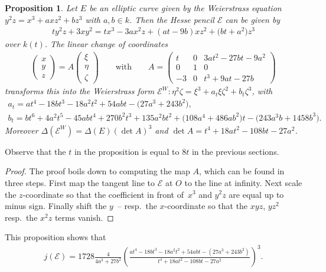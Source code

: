 \documentclass[11pt]{article}
\newcommand{\msetp}[1]{{\left({#1}\right)}}					%
\numberwithin{equation}{section}
\newtheorem{Proposition}[Theorem]{Proposition}
\begin{document}
\begin{Proposition}\label{prop7}Let $E$ be an elliptic curve given by the Weierstrass equation $y^2z=x^3+axz^2+bz^3$ with $a,b\in k$. Then the Hesse pencil $\mathcal{E}$ can be given by
\begin{gather*}
ty^2z+3xy^2=tx^3-3ax^2z+\msetp{at-9b}xz^2+ \big(bt+a^2\big)z^3
\end{gather*}
over $k\msetp{t}$. The linear change of coordinates
\begin{gather*}
\begin{pmatrix}
x \\ y \\ z
\end{pmatrix}
=A\begin{pmatrix}
\xi \\ \eta \\ \zeta
\end{pmatrix}
\qquad\text{with}\qquad
A=\begin{pmatrix}
t & 0 & 3at^2-27bt-9a^2 \\
0 & 1 & 0 \\
-3 & 0 & t^3+9at-27b
\end{pmatrix}
\end{gather*}
transforms this into the Weierstrass form $\mathcal{E}^W\colon \eta^2\zeta=\xi^3+a_t \xi\zeta^2+b_t\zeta^3$, with
\begin{gather*}
a_t = at^4-18bt^3-18a^2t^2+54abt-\big(27a^3+243b^2\big), \\
b_t = bt^6+4a^2t^5-45abt^4+270b^2t^3+135a^2bt^2 +\big(108a^4+486ab^2\big)t-\big(243a^3b+1458b^3\big).
\end{gather*}
Moreover $\Delta\msetp{\mathcal{E}^W}=\Delta\msetp{E}\msetp{\det A}^3$ and $\det A=t^4+18at^2-108bt-27a^2$.
\end{Proposition}

Observe that the $t$ in the proposition is equal to $8t$ in the previous sections.

\begin{proof}The proof boils down to computing the map $A$, which can be found in three steps. First map the tangent line to $\mathcal{E}$ at $O$ to the line at infinity. Next scale the $z$-coordinate so that the coefficient in front of~$x^3$ and $y^2z$ are equal up to minus sign. Finally shift the $y$~-- resp.\ the $x$-coordinate so that the $xyz$, $yz^2$ resp.\ the $x^2z$ terms vanish.
\end{proof}

This proposition shows that
\begin{gather*}
j\msetp{\mathcal{E}}=1728\frac{4}{4a^3+27b^2}\msetp{\frac{at^4-18bt^3-18a^2t^2+54abt-\msetp{27a^3+243b^2}}{t^4+18at^2-108bt-27a^2}}^3.
\end{gather*}
\end{document}
